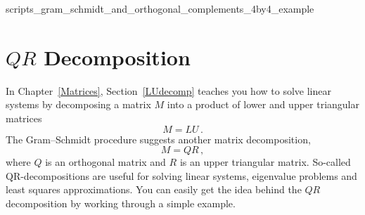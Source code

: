  {scripts_gram_schmidt_and_orthogonal_complements_4by4_example}

\section{$QR$ Decomposition}
In Chapter~\ref{Matrices}, Section~\ref{LUdecomp} teaches you how to solve linear systems by decomposing a matrix $M$ into 
a product of lower and upper triangular matrices
\[M=LU\, .\]
The Gram--Schmidt procedure suggests another matrix decomposition,
\[M=QR\, ,\] 
where $Q$ is an orthogonal matrix and $R$ is an upper triangular matrix. So-called QR-decompositions
are useful for solving linear systems, eigenvalue problems and least squares approximations. You can
easily get the idea behind the $QR$ decomposition by working through a simple example.

